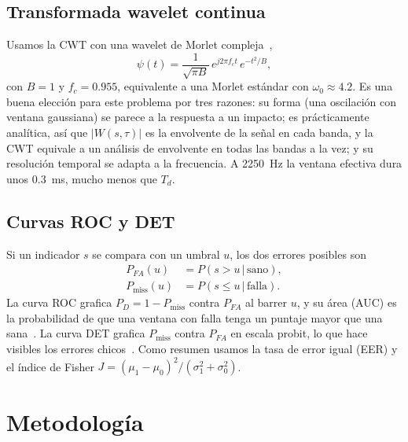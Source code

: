 \documentclass[conference,a4paper]{IEEEtran}
\begin{document}
\subsection{Transformada wavelet continua}
Usamos la CWT con una wavelet de Morlet compleja~\cite{torrence1998,pywavelets},
\begin{equation}
\psi(t)=\frac{1}{\sqrt{\pi B}}\,e^{j2\pi f_c t}\,e^{-t^2/B},
\end{equation}
con $B=1$ y $f_c=0.955$, equivalente a una Morlet estándar con $\omega_0\approx4.2$. Es una buena elección para este problema por tres razones: su forma (una oscilación con ventana gaussiana) se parece a la respuesta a un impacto; es prácticamente analítica, así que $|W(s,\tau)|$ es la envolvente de la señal en cada banda, y la CWT equivale a un análisis de envolvente en todas las bandas a la vez; y su resolución temporal se adapta a la frecuencia. A 2250~Hz la ventana efectiva dura unos 0.3~ms, mucho menos que $T_d$.

\subsection{Curvas ROC y DET}
Si un indicador $s$ se compara con un umbral $u$, los dos errores posibles son
\begin{equation}
\begin{split}
P_{FA}(u)&=P(s>u\,|\,\text{sano}),\\
P_{\mathrm{miss}}(u)&=P(s\le u\,|\,\text{falla}).
\end{split}
\end{equation}
La curva ROC grafica $P_D=1-P_{\mathrm{miss}}$ contra $P_{FA}$ al barrer $u$, y su área (AUC) es la probabilidad de que una ventana con falla tenga un puntaje mayor que una sana~\cite{fawcett2006}. La curva DET grafica $P_{\mathrm{miss}}$ contra $P_{FA}$ en escala probit, lo que hace visibles los errores chicos~\cite{martin1997}. Como resumen usamos la tasa de error igual (EER) y el índice de Fisher $J=(\mu_1-\mu_0)^2/(\sigma_1^2+\sigma_0^2)$.

\section{Metodología}
\end{document}
